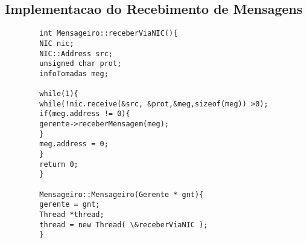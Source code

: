 \documentclass[article,11pt,oneside,a4paper,english,brazil]{abntex2}
\begin{document}


%
%


\newpage
\begin{apendicesenv}

\chapter{Implementacao do Recebimento de Mensagens} \label{apen:implementacaoNIC}
	\begin{lstlisting}
		int Mensageiro::receberViaNIC(){
		NIC nic;		
		NIC::Address src;
		unsigned char prot;
		infoTomadas meg;
		
		while(1){
		while(!nic.receive(&src, &prot,&meg,sizeof(meg)) >0);
		if(meg.address != 0){
		gerente->receberMensagem(meg);
		}
		meg.address = 0;
		}
		return 0;
		}	
		
		Mensageiro::Mensageiro(Gerente * gnt){
		gerente = gnt;
		Thread *thread;
		thread = new Thread( \&receberViaNIC );
		}
	\end{lstlisting}

%
\end{apendicesenv}

%
%
%
\end{document}
